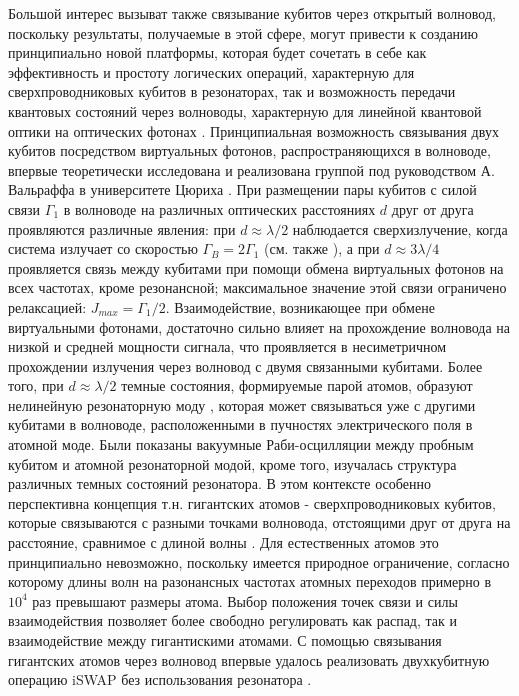 Большой интерес вызыват также связывание кубитов через открытый волновод, поскольку результаты, получаемые в этой сфере, могут привести к созданию принципиально новой платформы, которая будет сочетать в себе как эффективность и простоту логических операций, характерную для сверхпроводниковых кубитов в резонаторах, так и возможность передачи квантовых состояний через волноводы, характерную для линейной квантовой оптики на оптических фотонах \cite{LOQCreview}. Принципиальная возможность связывания двух кубитов посредством виртуальных фотонов, распространяющихся в волноводе, впервые теоретически исследована и реализована группой под руководством А. Вальраффа в университете Цюриха \cite{vanLoo1494}. При размещении пары кубитов с силой связи $\Gamma_1$ в волноводе на различных оптических расстояниях $d$ друг от друга проявляются различные явления: при $d \approx \lambda/2$ наблюдается сверхизлучение, когда система излучает со скоростью $\Gamma_B = 2\Gamma_1$ (см. также \cite{mlynek2014observation}), а при $d\approx 3\lambda/4$ проявляется связь между кубитами при помощи обмена виртуальных фотонов на всех частотах, кроме резонансной; максимальное значение этой связи ограничено релаксацией: $J_{max}=\Gamma_1/2$. Взаимодействие, возникающее при обмене виртуальными фотонами, достаточно сильно влияет на прохождение волновода на низкой и средней мощности сигнала, что проявляется в несиметричном прохождении излучения через волновод с двумя связанными кубитами. Более того, при $d \approx \lambda/2$ темные состояния, формируемые парой атомов, образуют нелинейную резонаторную моду \cite{mirhosseini2019cavity}, которая может связываться уже с другими кубитами в волноводе, расположенными в пучностях электрического поля в атомной моде.  Были показаны вакуумные Раби-осцилляции между пробным кубитом и атомной резонаторной модой, кроме того, изучалась структура различных темных состояний резонатора. В этом контексте особенно перспективна концепция т.н. гигантских атомов - сверхпроводниковых кубитов, которые связываются с разными точками волновода, отстоящими друг от друга на расстояние, сравнимое с длиной волны \cite{kockum2019quantum}. Для естественных атомов это принципиально невозможно, поскольку имеется природное ограничение, согласно которому длины волн на разонансных частотах атомных переходов примерно в $10^4$ раз превышают размеры атома. Выбор положения точек связи и силы взаимодействия позволяет более свободно регулировать как распад, так и взаимодействие между гигантискими атомами. С помощью связывания гигантских атомов через волновод впервые удалось реализовать двухкубитную операцию iSWAP без использования резонатора \cite[]{kannan2019waveguide}. 

